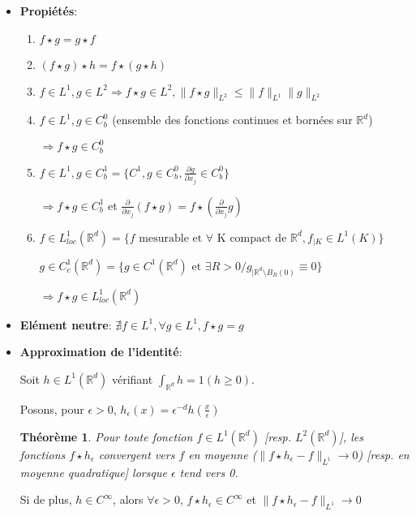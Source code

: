 \documentclass[10pt,a4paper,oneside]{article}
\newtheorem{theoreme}{Théorème}
\begin{document}
\begin{itemize}
\item
\textbf{Propiétés}:

\begin{enumerate}
\item
$f \star g = g \star f$

\item
$(f \star g) \star h = f \star (g \star h)$

\item
$f \in L^1, g \in L^2 \Rightarrow f \star g \in L^2, \| f \star g \|_{L^2} \leq \| f \|_{L^1} \| g \|_{L^2}$

\item
$f \in L^1, g \in C^0_b$ (ensemble des fonctions continues et bornées sur $\mathbb{R}^d$)

$\Rightarrow f \star g \in C^0_b$
\item
$f \in L^1, g \in C^1_b = \{ C^1,g \in C^0_b, \frac{\partial g}{\partial x_j} \in C^0_b \}$

$\Rightarrow f \star g \in C^1_b$ et $\frac{\partial}{\partial x_j}(f \star g) = f \star (\frac{\partial}{\partial x_j} g)$

\item
$f \in L^1_{loc}(\mathbb{R}^d) = \{f \text{ mesurable et } \forall \text{ K compact de } \mathbb{R}^d, f_{|K} \in L^1(K)\}$

$g \in C^1_c(\mathbb{R}^d) = \{ g \in C^1(\mathbb{R}^d) \text{ et } \exists R > 0 / g_{|\mathbb{R}^d \setminus B_{R}(0)} \equiv 0 \}$

$\Rightarrow f \star g \in L^1_{loc}(\mathbb{R}^d)$
\end{enumerate}

\item
\textbf{Elément neutre}: $\nexists f \in L^1, \forall g \in L^1, f \star g = g$

\item
\textbf{Approximation de l'identité}: 

Soit $h \in L^1(\mathbb{R}^d)$ vérifiant $\int_{\mathbb{R}^d} h = 1 (h \geq 0)$.

Posons, pour $\epsilon > 0$, $h_{\epsilon} (x)  = \epsilon^{-d} h(\frac{x}{\epsilon})$

\begin{theoreme}
Pour toute fonction $f \in L^1(\mathbb{R}^d)$ [resp. $L^2(\mathbb{R}^d)$], les fonctions $f \star h_\epsilon$ convergent vers $f$ en moyenne ($\| f \star h_\epsilon - f \|_{L^1} \to 0$) [resp. en moyenne quadratique] lorsque $\epsilon$ tend vers 0.
\end{theoreme}

Si de plus, $h \in C^{\infty}$, alors $\forall \epsilon > 0$, $f \star h_\epsilon \in C^{\infty}$ et $\| f \star h_\epsilon - f \|_{L^1} \to 0$
\end{itemize}
\end{document}
